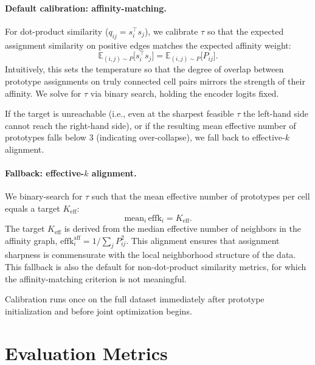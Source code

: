 \paragraph{Default calibration: affinity-matching.}
For dot-product similarity ($q_{ij} = s_i^\top s_j$), we calibrate $\tau$ so that the expected assignment similarity on positive edges matches the expected affinity weight:
\begin{equation}
\mathbb{E}_{(i,j) \sim P}\bigl[s_i^\top s_j\bigr] = \mathbb{E}_{(i,j) \sim P}\bigl[P_{ij}\bigr].
\end{equation}
Intuitively, this sets the temperature so that the degree of overlap between prototype assignments on truly connected cell pairs mirrors the strength of their affinity. We solve for $\tau$ via binary search, holding the encoder logits fixed.

If the target is unreachable (i.e., even at the sharpest feasible $\tau$ the left-hand side cannot reach the right-hand side), or if the resulting mean effective number of prototypes falls below 3 (indicating over-collapse), we fall back to effective-$k$ alignment.

\paragraph{Fallback: effective-$k$ alignment.}
We binary-search for $\tau$ such that the mean effective number of prototypes per cell equals a target $K_\mathrm{eff}$:
\begin{equation}
\mathrm{mean}_i\,\mathrm{effk}_i = K_\mathrm{eff}.
\end{equation}
The target $K_\mathrm{eff}$ is derived from the median effective number of neighbors in the affinity graph, $\mathrm{effk}_i^{\mathrm{aff}} = 1/\sum_j P_{ij}^2$. This alignment ensures that assignment sharpness is commensurate with the local neighborhood structure of the data. This fallback is also the default for non-dot-product similarity metrics, for which the affinity-matching criterion is not meaningful.

Calibration runs once on the full dataset immediately after prototype initialization and before joint optimization begins.

\section{Evaluation Metrics}
\label{app:metrics}


